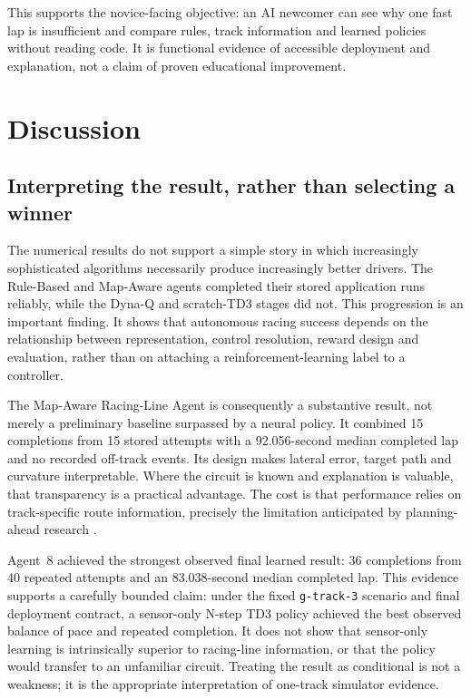 This supports the novice-facing objective: an AI newcomer can see why one fast lap is insufficient and compare rules, track information and learned policies without reading code. It is functional evidence of accessible deployment and explanation, not a claim of proven educational improvement.

\section{Discussion}
\label{ch:discussion}

\subsection{Interpreting the result, rather than selecting a winner}

The numerical results do not support a simple story in which increasingly sophisticated algorithms necessarily produce increasingly better drivers. The Rule-Based and Map-Aware agents completed their stored application runs reliably, while the Dyna-Q and scratch-TD3 stages did not. This progression is an important finding. It shows that autonomous racing success depends on the relationship between representation, control resolution, reward design and evaluation, rather than on attaching a reinforcement-learning label to a controller.

The Map-Aware Racing-Line Agent is consequently a substantive result, not merely a preliminary baseline surpassed by a neural policy. It combined 15 completions from 15 stored attempts with a 92.056-second median completed lap and no recorded off-track events. Its design makes lateral error, target path and curvature interpretable. Where the circuit is known and explanation is valuable, that transparency is a practical advantage. The cost is that performance relies on track-specific route information, precisely the limitation anticipated by planning-ahead research \parencite{quadflieg2010}.

Agent~8 achieved the strongest observed final learned result: 36 completions from 40 repeated attempts and an 83.038-second median completed lap. This evidence supports a carefully bounded claim: under the fixed \texttt{g-track-3} scenario and final deployment contract, a sensor-only N-step TD3 policy achieved the best observed balance of pace and repeated completion. It does not show that sensor-only learning is intrinsically superior to racing-line information, or that the policy would transfer to an unfamiliar circuit. Treating the result as conditional is not a weakness; it is the appropriate interpretation of one-track simulator evidence.

